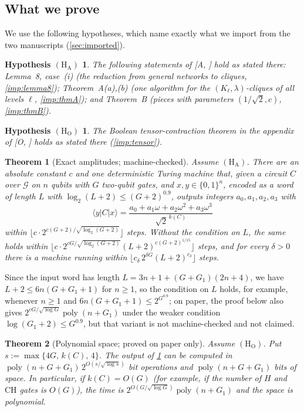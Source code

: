 \documentclass[10pt]{amsart}
\theoremstyle{plain}
\newtheorem{theorem}{Theorem}[section]
\newtheorem*{hypA}{Hypothesis $(\mathrm{H}_{\mathrm{A}})$}
\newtheorem*{hypO}{Hypothesis $(\mathrm{H}_{\mathrm{O}})$}
\theoremstyle{definition}
\theoremstyle{remark}
\numberwithin{equation}{section}
\newcommand{\poly}{\operatorname{poly}}
\newcommand{\cG}{\mathcal{G}}
\newcommand{\amp}[3]{\langle #1|#2|#3\rangle}
\newcommand{\A}[1][]{\textup{[A\if\relax\detokenize{#1}\relax\else, #1\fi]}}
\newcommand{\Oa}[1][]{\textup{[O\if\relax\detokenize{#1}\relax\else, #1\fi]}}
\begin{document}
\subsection{What we prove}
We use the following hypotheses, which name exactly what we import from the two manuscripts
(\cref{sec:imported}).

\begin{hypA}
The following statements of \A{} hold as stated there: Lemma~8, case~(i) (the reduction from
general networks to cliques, \cref{imp:lemma8}); Theorem~A(a),(b) (one algorithm for the
$(K_\ell,\lambda)$-cliques of all levels $\ell$, \cref{imp:thmA}); and Theorem~B (pieces with
parameters $(1/\sqrt2,c)$, \cref{imp:thmB}).
\end{hypA}

\begin{hypO}
The Boolean tensor-contraction theorem in the appendix of \Oa{} holds as stated there
(\cref{imp:tensor}).
\end{hypO}

\begin{theorem}[Exact amplitudes; machine-checked]\label{thm:main}
Assume $(\mathrm{H}_{\mathrm{A}})$. There are an absolute constant $c$ and one deterministic
Turing machine that, given a circuit $C$ over $\cG$ on $n$ qubits with $G$ two-qubit gates, and
$x,y\in\{0,1\}^n$, encoded as a word of length $L$ with $\log_2(L+2)\le(G+2)^{0.9}$, outputs
integers $a_0,a_1,a_2,a_3$ with
\[
  \amp{y}{C}{x}=\frac{a_0+a_1\omega+a_2\omega^2+a_3\omega^3}{\sqrt2^{\,k(C)}}
\]
within $\lfloor c\cdot2^{c(G+2)/\sqrt{\log_2(G+2)}}\rfloor$ steps. Without the condition on $L$,
the same holds within $\lfloor c\cdot2^{cG/\sqrt{\log_2(G+2)}}(L+2)^{c(G+2)^{1/15}}\rfloor$ steps,
and for every $\delta>0$ there is a machine running within $\lfloor c_\delta\,2^{\delta G}(L+2)^{c_\delta}\rfloor$ steps.
\end{theorem}
\noindent Since the input word has length $L=3n+1+(G+G_1)(2n+4)$, we have $L+2\le 6n(G+G_1+1)$ for
$n\ge1$, so the condition on $L$ holds, for example, whenever $n\ge1$ and $6n(G+G_1+1)\le 2^{G^{0.9}}$; on paper,
the proof below also gives $2^{cG/\sqrt{\log G}}\poly(n+G_1)$ under the weaker condition
$\log(G_1+2)\le G^{0.9}$, but that variant is not machine-checked and not claimed.

\begin{theorem}[Polynomial space; proved on paper only]\label{thm:openai}
Assume $(\mathrm{H}_{\mathrm{O}})$. Put $s:=\max\{4G,\,k(C),\,4\}$. The output of
\cref{thm:main} can be computed in $\poly(n+G+G_1)\,2^{O(s/\sqrt{\log s})}$ bit operations and
$\poly(n+G+G_1)$ bits of space. In particular, if $k(C)=O(G)$ (for example, if the number of
$H$ and $\mathrm{CH}$ gates is $O(G)$), the time is $2^{O(G/\sqrt{\log G})}\poly(n+G_1)$ and the
space is polynomial.
\end{theorem}
\end{document}
